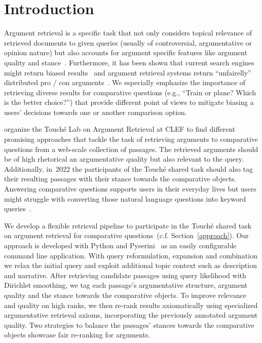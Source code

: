\section{Introduction}\label{intro}

Argument retrieval is a specific task that not only considers topical relevance of retrieved documents to given queries (usually of controversial, argumentative or opinion nature) but also accounts for argument specific features like argument quality and stance~\cite{BondarenkoFBGAPBSWPH2020, BondarenkoGFBAPBSWPH2021}.  
Furthermore, it has been shown that current search engines might return biased results~\cite{ShahB2022} and argument retrieval systems return ``unfairelly'' distributed pro / con arguments~\cite{CherumanalSSC2021}. We especially emphasize the importance of retrieving diverse results for comparative questions (e.g., ``Train or plane? Which is the better choice?'') that provide different point of views to mitigate biasing a users' decisions towards one or another comparison option.

\citet{BondarenkoFKSGBPBSWPH2022} organize the Touché Lab on Argument Retrieval at CLEF to find different promising approaches that tackle the task of retrieving arguments to comparative questions from a web-scale collection of passages.
The retrieved arguments should be of high rhetorical an argumentative quality but also relevant to the query.
Additionally, in~2022 the participants of the Touché shared task should also tag their resulting passages with their stance towards the comparative objects.
Answering comparative questions supports users in their everyday lives but users might struggle with converting those natural language questions into keyword queries~\cite{BondarenkoGFBAPBSWPH2021}.

We develop a flexible retrieval pipeline to participate in the Touché shared task on argument retrieval for comparative questions~(c.f. Section~\ref{approach}).
Our approach is developed with Python and Pyserini~\cite{LinMLYPN2021} as an easily configurable command line application.
With query reformulation, expansion and combination we relax the initial query and exploit additional topic context such as description and narrative.
After retrieving candidate passages using query likelihood with Dirichlet smoothing, we tag each passage's argumentative structure, argument quality and the stance towards the comparative objects.
To improve relevance and quality on high ranks, we then re-rank results axiomatically using specialized argumentative retrieval axioms, incorporating the previously annotated argument quality.
Two strategies to balance the passages' stances towards the comparative objects showcase fair re-ranking for arguments.

